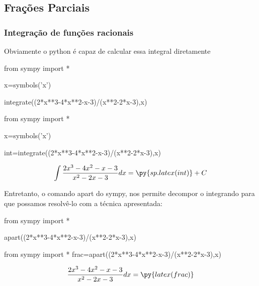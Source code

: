 
\subsection*{Frações Parciais}

\begin{frame}
\frametitle{Integração de funções racionais }
\begin{small}

\bigskip

\bigskip


\end{small}
\end{frame}

\begin{frame}[fragile=singleslide]{}
	Obviamente o python é capaz de calcular essa integral diretamente
\begin{block}{ }
	\begin{pyverbatim}
from sympy import *

x=symbols('x')

integrate((2*x**3-4*x**2-x-3)/(x**2-2*x-3),x)
\end{pyverbatim}
\end{block}
\begin{pycode}
from sympy import *

x=symbols('x')

int=integrate((2*x**3-4*x**2-x-3)/(x**2-2*x-3),x)
\end{pycode}
\[\int \frac{2x^3-4x^2-x-3}{x^2-2x-3}dx=\py{sp.latex(int)}+C\]
\end{frame}

\begin{frame}[fragile=singleslide]{}
Entretanto, o comando apart do sympy, nos permite decompor o integrando para que possamos resolvê-lo com a técnica apresentada:
\begin{block}{ }
\begin{pyverbatim}
from sympy import *

apart((2*x**3-4*x**2-x-3)/(x**2-2*x-3),x)
\end{pyverbatim}
\end{block}
\begin{pycode}
from sympy import *
frac=apart((2*x**3-4*x**2-x-3)/(x**2-2*x-3),x)
\end{pycode}
\[\frac{2x^3-4x^2-x-3}{x^2-2x-3}dx=\py{latex(frac)}\]
\end{frame}



